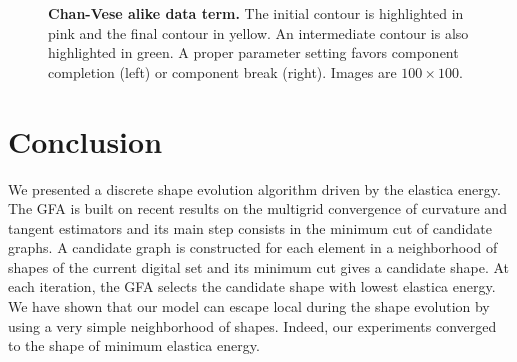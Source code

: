 \documentclass[review]{siamart220329}
\begin{document}
\begin{figure}
\center
{}\hspace{1em}%
%
\caption{\textbf{Chan-Vese alike data term.} The initial contour is highlighted in pink and the final contour in yellow. An intermediate contour is also highlighted in green. A proper parameter setting favors component completion (left) or component break (right). Images are $100\times100$. }
\label{fig:GF-chan-vese-alike}
\end{figure}
%
%
%
%
\section{Conclusion}
%
%
We presented a discrete shape evolution algorithm driven by the elastica energy. The GFA is built on recent results on the multigrid convergence of curvature and tangent estimators and its main step consists in  the minimum cut of candidate graphs. A candidate graph is constructed for each element in a neighborhood of shapes of the current digital set and its minimum cut gives a candidate shape. At each iteration, the GFA selects the candidate shape with lowest elastica energy. We have shown that our model can escape local  during the shape evolution by using a very simple neighborhood  of shapes. Indeed, our experiments converged to the shape of minimum elastica energy. 
\end{document}
